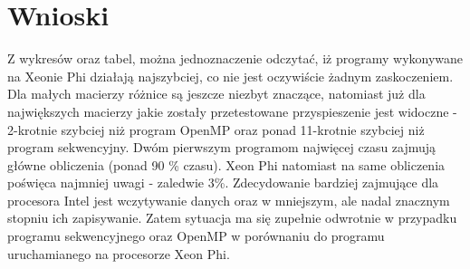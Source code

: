 \documentclass[a4paper]{article}
\begin{document}
\section {Wnioski}
Z wykresów oraz tabel, można jednoznaczenie odczytać, iż programy wykonywane na Xeonie Phi działają najszybciej, co nie jest oczywiście żadnym zaskoczeniem. Dla małych macierzy różnice są jeszcze niezbyt znaczące, natomiast już dla największych macierzy jakie zostały przetestowane przyspieszenie jest widoczne - 2-krotnie szybciej niż program OpenMP oraz ponad 11-krotnie szybciej niż program sekwencyjny. Dwóm pierwszym programom najwięcej czasu zajmują główne obliczenia (ponad 90 \% czasu). Xeon Phi natomiast na same obliczenia poświęca najmniej uwagi - zaledwie 3\%. Zdecydowanie bardziej zajmujące dla procesora Intel jest wczytywanie danych oraz w mniejszym, ale nadal znacznym stopniu ich zapisywanie. Zatem sytuacja ma się zupełnie odwrotnie w przypadku programu sekwencyjnego oraz OpenMP w porównaniu do programu uruchamianego na procesorze Xeon Phi.
\end{document}
